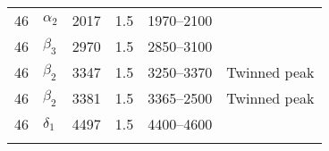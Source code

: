 \begin{center}
\begin{tabular}[h!]{llllll}
46              & $\alpha_2$& 2017                  & 1.5           & 1970--2100    & \\
46              & $\beta_3$ & 2970                  & 1.5           & 2850--3100    & \\
46              & $\beta_2$ & 3347                  & 1.5           & 3250--3370    & Twinned peak \\
46              & $\beta_2$ & 3381                  & 1.5           & 3365--2500    & Twinned peak \\
46              & $\delta_1$& 4497                  & 1.5           & 4400--4600    & \\
\bottomrule

\label{Table:Appendix:MicroFitParams}
\caption{}
    \end{tabular}
\end{center}
